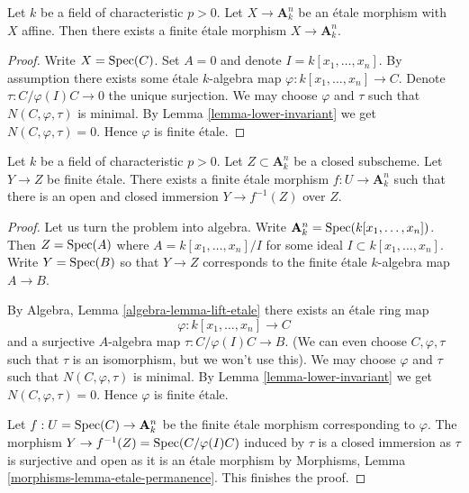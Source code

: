 \begin{lemma}
\label{lemma-affine-etale-over-affine-space}
Let $k$ be a field of characteristic $p > 0$. Let $X \to \mathbf{A}^n_k$ be an
\'etale morphism with $X$ affine. Then there exists a finite \'etale
morphism $X \to \mathbf{A}^n_k$.
\end{lemma}

\begin{proof}
Write $X = \mathop{\mathrm{Spec}}(C)$. Set $A = 0$ and denote $I = k[x_1, \ldots, x_n]$.
By assumption there exists some \'etale $k$-algebra map
$\varphi : k[x_1, \ldots, x_n] \to C$. Denote $\tau : C/\varphi(I)C \to 0$
the unique surjection. We may choose $\varphi$ and $\tau$ such
that $N(C, \varphi, \tau)$ is minimal. By Lemma \ref{lemma-lower-invariant}
we get $N(C, \varphi, \tau) = 0$. Hence $\varphi$ is finite \'etale.
\end{proof}

\begin{lemma}
\label{lemma-dominate-affine-space}
Let $k$ be a field of characteristic $p > 0$. Let $Z \subset \mathbf{A}^n_k$
be a closed subscheme. Let $Y \to Z$ be finite \'etale. There exists a
finite \'etale morphism $f : U \to \mathbf{A}^n_k$ such that
there is an open and closed immersion $Y \to f^{-1}(Z)$ over $Z$.
\end{lemma}

\begin{proof}
Let us turn the problem into algebra. Write
$\mathbf{A}^n_k = \mathop{\mathrm{Spec}}(k[x_1, \ldots, x_n])$.
Then $Z = \mathop{\mathrm{Spec}}(A)$ where $A = k[x_1, \ldots, x_n]/I$
for some ideal $I \subset k[x_1, \ldots, x_n]$.
Write $Y = \mathop{\mathrm{Spec}}(B)$ so that $Y \to Z$ corresponds to
the finite \'etale $k$-algebra map $A \to B$.

\medskip\noindent
By Algebra, Lemma \ref{algebra-lemma-lift-etale}
there exists an \'etale ring map
$$
\varphi : k[x_1, \ldots, x_n] \to C
$$
and a surjective $A$-algebra map $\tau : C/\varphi(I)C \to B$.
(We can even choose $C, \varphi, \tau$ such that $\tau$ is an isomorphism,
but we won't use this). We may choose $\varphi$ and $\tau$ such
that $N(C, \varphi, \tau)$ is minimal. By Lemma \ref{lemma-lower-invariant}
we get $N(C, \varphi, \tau) = 0$. Hence $\varphi$ is finite \'etale.

\medskip\noindent
Let $f : U = \mathop{\mathrm{Spec}}(C) \to \mathbf{A}^n_k$ be the finite \'etale
morphism corresponding to $\varphi$. The morphism
$Y \to f^{-1}(Z) = \mathop{\mathrm{Spec}}(C/\varphi(I)C)$ induced by $\tau$
is a closed immersion as $\tau$ is surjective and open as
it is an \'etale morphism by Morphisms, Lemma
\ref{morphisms-lemma-etale-permanence}. This finishes the proof.
\end{proof}

